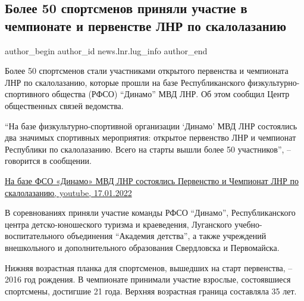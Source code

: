  
 
 
 
 
\subsection{Более 50 спортсменов приняли участие в чемпионате и первенстве ЛНР по скалолазанию}
\label{sec:17_01_2022.stz.news.lnr.lug_info.1.skalolazanie}

\ifcmt
 author_begin
   author_id news.lnr.lug_info
 author_end
\fi

Более 50 спортсменов стали участниками открытого первенства и чемпионата ЛНР по
скалолазанию, которые прошли на базе Республиканского физкультурно-спортивного
общества (РФСО) \enquote{Динамо} МВД ЛНР. Об этом сообщил Центр общественных связей
ведомства.

\enquote{На базе физкультурно-спортивной организации 
\enquote{Динамо} МВД ЛНР состоялись два
значимых спортивных мероприятия: открытое первенство ЛНР и чемпионат Республики
по скалолазанию. Всего на старты вышли более 50 участников}, – говорится в
сообщении.

\href{https://www.youtube.com/watch?v=0KS-YJgJ0oQ}{%
На базе ФСО «Динамо» МВД ЛНР состоялись Первенство и Чемпионат ЛНР по скалолазанию, %
youtube, 17.01.2022%
}


В соревнованиях приняли участие команды РФСО \enquote{Динамо}, Республиканского центра
детско-юношеского туризма и краеведения, Луганского учебно-воспитательного
объединения \enquote{Академия детства}, а также учреждений внешкольного и
дополнительного образования Свердловска и Первомайска.


Нижняя возрастная планка для спортсменов, вышедших на старт первенства, – 2016
год рождения. В чемпионате принимали участие взрослые, состоявшиеся спортсмены,
достигшие 21 года. Верхняя возрастная граница составляла 35 лет.

